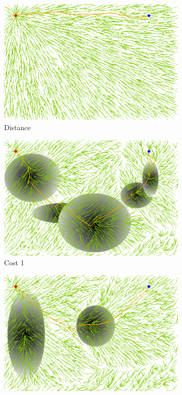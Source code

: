 \documentclass{article}
\begin{document}
\begin{figure}
	\centering
	\begin{subfigure}[b]{0.31\linewidth}
		\centering
		\includegraphics[width=\textwidth]{fig/sim6-3obj/MORRTstar02-0.png}
		\caption{Distance}
		\label{fig:sim:many:distance}
	\end{subfigure}
	\begin{subfigure}[b]{0.31\linewidth}
		\centering
		\includegraphics[width=\textwidth]{fig/sim6-3obj/MORRTstar02-1.png}
		\caption{Cost 1}
		\label{fig:sim:many:fitness1}
	\end{subfigure}
	\begin{subfigure}[b]{0.31\linewidth}
		\centering
		\includegraphics[width=\textwidth]{fig/sim6-3obj/MORRTstar02-2.png}

\end{subfigure}
\end{figure}
\end{document}
